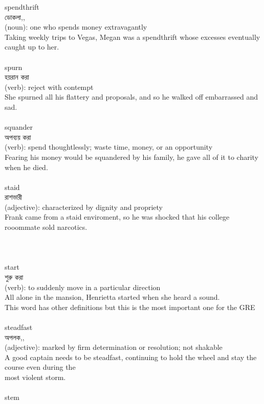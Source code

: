 \documentclass{article}
\begin{document}
{spendthrift}\\
{ডোকলা,,}\\
{(noun): one who spends money extravagantly\\Taking weekly trips to Vegas, Megan was a spendthrift whose excesses eventually caught up to her.\\}\\
{spurn}\\
{হয়রান করা}\\
{(verb): reject with contempt\\She spurned all his flattery and proposals, and so he walked off embarrassed and sad.\\}\\
{squander}\\
{অপব্যয় করা}\\
{(verb): spend thoughtlessly; waste time, money, or an opportunity\\Fearing his money would be squandered by his family, he gave all of it to charity when he died.\\}\\
{staid}\\
{রাশভারী}\\
{(adjective): characterized by dignity and propriety\\Frank came from a staid enviroment, so he was shocked that his college rooommate sold narcotics.\\\\                                                                                  \\}\\
{start}\\
{শুরু করা}\\
{(verb): to suddenly move in a particular direction\\All alone in the mansion, Henrietta started when she heard a sound.\\This word has other definitions but this is the most important one for the GRE\\}\\
{steadfast}\\
{অপলক,,}\\
{(adjective): marked by firm determination or resolution; not shakable\\A good captain needs to be steadfast, continuing to hold the wheel and stay the course even during the\\most violent storm.\\}\\
{stem}\\
\end{document}
